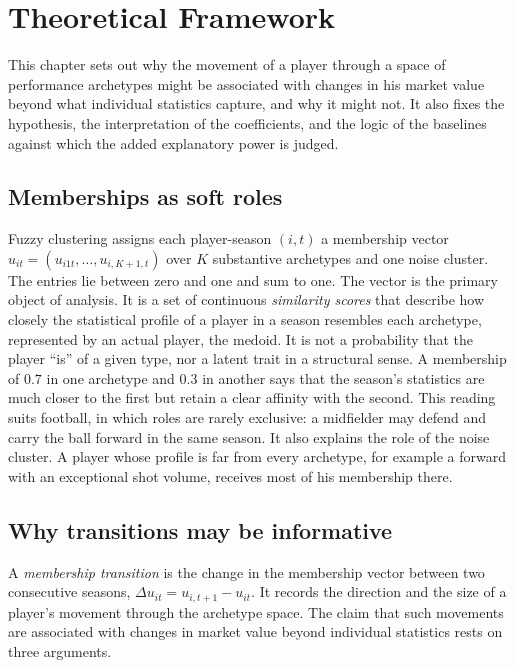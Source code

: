 \chapter{Theoretical Framework}
\label{ch:theory}

This chapter sets out why the movement of a player through a space of performance archetypes might be associated with changes in his market value beyond what individual statistics capture, and why it might not. It also fixes the hypothesis, the interpretation of the coefficients, and the logic of the baselines against which the added explanatory power is judged.

\section{Memberships as soft roles}
\label{sec:theory-memberships}

Fuzzy clustering assigns each player-season $(i,t)$ a membership vector $u_{it}=(u_{i1t},\dots,u_{i,K+1,t})$ over $K$ substantive archetypes and one noise cluster. The entries lie between zero and one and sum to one. The vector is the primary object of analysis. It is a set of continuous \emph{similarity scores} that describe how closely the statistical profile of a player in a season resembles each archetype, represented by an actual player, the medoid. It is not a probability that the player ``is'' of a given type, nor a latent trait in a structural sense. A membership of $0.7$ in one archetype and $0.3$ in another says that the season's statistics are much closer to the first but retain a clear affinity with the second. This reading suits football, in which roles are rarely exclusive: a midfielder may defend and carry the ball forward in the same season. It also explains the role of the noise cluster. A player whose profile is far from every archetype, for example a forward with an exceptional shot volume, receives most of his membership there.

\section{Why transitions may be informative}
\label{sec:theory-why}

A \emph{membership transition} is the change in the membership vector between two consecutive seasons, $\Delta u_{it}=u_{i,t+1}-u_{it}$. It records the direction and the size of a player's movement through the archetype space. The claim that such movements are associated with changes in market value beyond individual statistics rests on three arguments.

